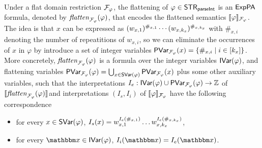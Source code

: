 
Under a flat domain restriction $\mathcal{F}_\varphi$, the flattening of $\varphi \in {\sf STR}_{\textsf{parseInt}}$ is an ${\sf ExpPA}$ formula, denoted by $\mathit{flatten}_{\mathcal{F}_\varphi}(\varphi)$, that encodes the flattened semantics $\llbracket \varphi \rrbracket_{\mathcal{F}_\varphi}$. 
The idea is that $x$ can be expressed as $(w_{x,1})^{\#_{x,1}} \cdots (w_{x, k_x})^{\#_{x,k_x}}$ with $\#_{x,i}$ denoting the number of repeatitions of $w_{x,i}$,  
so we can eliminate the occurrences of $x$ in $\varphi$ by introduce a set of integer variables $\textsf{PVar}_{\mathcal{F}_\varphi}(x) = \{\#_{x,i} \mid i \in [k_x]\}$. 
More concretely, $\mathit{flatten}_{\mathcal{F}_\varphi}(\varphi)$ is a formula over the integer variables $\textsf{IVar}(\varphi)$,  and flattening variables $\textsf{PVar}_{\mathcal{F}_\varphi}(\varphi) = \bigcup_{x \in \textsf{SVar}(\varphi)} \textsf{PVar}_{\mathcal{F}_\varphi}(x)$ plus some other auxiliary variables, such that the interpretations $I_e: \textsf{IVar}(\varphi) \cup \textsf{PVar}_{\mathcal{F}_\varphi}(\varphi) \rightarrow \mathbb Z$ of $\llbracket \mathit{flatten}_{\mathcal{F}_\varphi}(\varphi) \rrbracket$and interpretations $(I_s, I_i)$ of $\llbracket \varphi \rrbracket_{\mathcal{F}_\varphi}$ have the following correspondence 

\begin{itemize}
    \item  
    for every $ x \in \textsf{SVar}(\varphi)$, $I_s(x) = w_{x,1}^{I_e(\#_{x,1})} \ldots  w_{x,k_x}^{I_e(\#_{x,k_x})}$, 
    \item for every $ \ivarx \in \ivar(\varphi)$, $I_i(\ivarx) = I_e(\ivarx)$.
\end{itemize}

